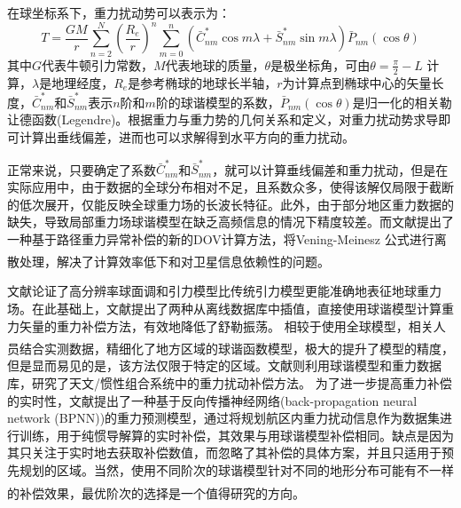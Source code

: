 \documentclass[12pt,a4,utf8]{article}
\newcommand{\upcite}[1]{\textsuperscript{\textsuperscript{\cite{#1}}}} %
\begin{document}
在球坐标系下，重力扰动势可以表示为：
\begin{equation}
      T = \frac{GM}{r}\sum_{n=2}^{N}{\left( \frac{R_e}{r}\right)^n\sum_{m=0}^{n}(\bar{C}_{nm}^{\ast}\cos{m\lambda} + \bar{S}_{nm}^{\ast}\sin{m\lambda})\bar{P}_{nm}(\cos \theta)} 
\end{equation}
其中$G$代表牛顿引力常数，$M$代表地球的质量，$\theta$是极坐标角，可由$\theta = \frac{\pi}{2} - L$ 计算，$\lambda$是地理经度，$R_e$是参考椭球的地球长半轴，$r$为计算点到椭球中心的矢量长度，$\bar{C}_{nm}^{\ast}$和$\bar{S}_{nm}^{\ast}$表示$n$阶和$m$阶的球谐模型的系数，$\bar{P}_{nm}(\cos \theta)$是归一化的相关勒让德函数(Legendre)。根据重力与重力势的几何关系和定义，对重力扰动势求导即可计算出垂线偏差，进而也可以求解得到水平方向的重力扰动。

正常来说，只要确定了系数$\bar{C}_{nm}^{\ast}$和$\bar{S}_{nm}^{\ast}$，就可以计算垂线偏差和重力扰动，但是在实际应用中，由于数据的全球分布相对不足，且系数众多，使得该解仅局限于截断的低次展开，仅能反映全球重力场的长波长特征。此外，由于部分地区重力数据的缺失，导致局部重力场球谐模型在缺乏高频信息的情况下精度较差。而文献\cite{hao2022relative}提出了一种基于路径重力异常补偿的新的DOV计算方法，将Vening-Meinesz 公式进行离散处理\upcite{ning1994spherical,chen1982methods,ning2006refined}，解决了计算效率低下和对卫星信息依赖性的问题。

文献\cite{wang2016application}论证了高分辨率球面调和引力模型比传统引力模型更能准确地表征地球重力场。在此基础上，文献\cite{wu2016gravity}提出了两种从离线数据库中插值，直接使用球谐模型计算重力矢量的重力补偿方法，有效地降低了舒勒振荡。
相较于使用全球模型，相关人员结合实测数据，精细化了地方区域的球谐函数模型\upcite{zhu2019research,weng2020analysis}，极大的提升了模型的精度，但是显而易见的是，该方法仅限于特定的区域。文献\cite{Lenyue2024}则利用球谐模型和重力数据库，研究了天文/惯性组合系统中的重力扰动补偿方法。
为了进一步提高重力补偿的实时性，文献\cite{gao2021real}提出了一种基于反向传播神经网络(back-propagation neural network (BPNN))的重力预测模型，通过将规划航区内重力扰动信息作为数据集进行训练，用于纯惯导解算的实时补偿，其效果与用球谐模型补偿相同。缺点是因为其只关注于实时地去获取补偿数值，而忽略了其补偿的具体方案，并且只适用于预先规划的区域。当然，使用不同阶次的球谐模型针对不同的地形分布可能有不一样的补偿效果\upcite{Zhuhongbao2024,zhou2018}，最优阶次的选择是一个值得研究的方向。
\end{document}
